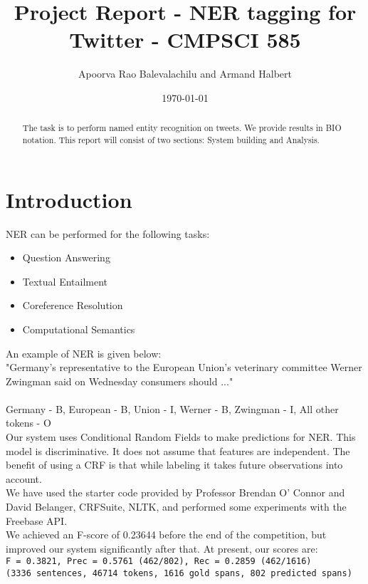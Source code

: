 \documentclass[a4paper]{article}
\title{Project Report - NER tagging for Twitter - CMPSCI 585}
\author{Apoorva Rao Balevalachilu and Armand Halbert}
\date{\today}
\begin{document}
\maketitle

\begin{abstract}

The task is to perform named entity recognition on tweets. We provide results in BIO notation. This report will consist of two sections: System building and Analysis.
\end{abstract}

\section{Introduction}

NER can be performed for the following tasks: 
\begin{itemize}
\item Question Answering
\item Textual Entailment
\item Coreference Resolution
\item Computational Semantics
\end{itemize}

An example of NER is given below: \\

"Germany’s representative to the European Union’s veterinary
committee Werner Zwingman said on Wednesday consumers should ..." \\
\\
Germany - B, 
European - B,
Union - I,
Werner - B, 
Zwingman - I,
All other tokens - O \\

Our system uses Conditional Random Fields to make predictions for NER. This model is discriminative. It does not assume that features are independent. The benefit of using a CRF is that while labeling it takes future observations into account. \\

We have used the starter code provided by Professor Brendan O' Connor and David Belanger, CRFSuite, NLTK, and performed some experiments with the Freebase API. \\

We achieved an F-score of 0.23644 before the end of the competition, but improved our system significantly after that. At present, our scores are: \\

\texttt{F = 0.3821,  Prec = 0.5761 (462/802),  Rec = 0.2859 (462/1616)} \\
\texttt{(3336 sentences, 46714 tokens, 1616 gold spans, 802 predicted spans)} \\
\end{document}

